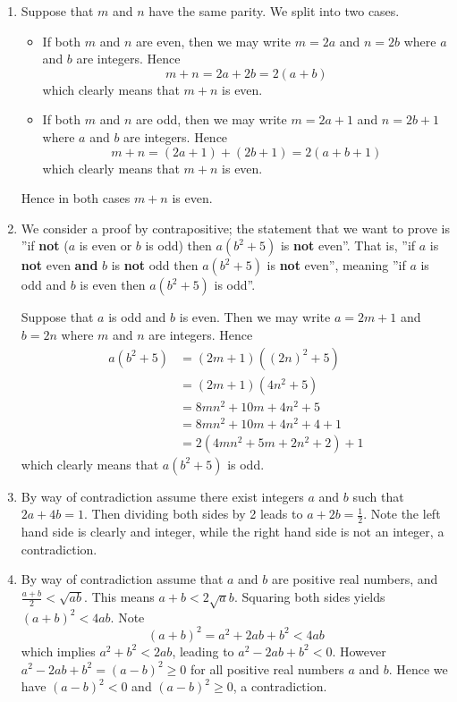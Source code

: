 \begin{enumerate}
    \item Suppose that $m$ and $n$ have the same parity. We split into two cases.
    \begin{itemize}
        \item If both $m$ and $n$ are even, then we may write $m = 2a$ and $n = 2b$ where $a$ and $b$ are integers. Hence
        \[
            m + n = 2a + 2b = 2(a+b)        
        \]
        which clearly means that $m + n$ is even.
        \item If both $m$ and $n$ are odd, then we may write $m = 2a + 1$ and $n = 2b + 1$ where $a$ and $b$ are integers. Hence
        \[
            m + n = (2a + 1) + (2b + 1) = 2(a + b + 1)        
        \]
        which clearly means that $m+n$ is even.
    \end{itemize}
    Hence in both cases $m + n$ is even.
    
    \item We consider a proof by contrapositive; the statement that we want to prove is ''if \textbf{not} ($a$ is even or $b$ is odd) then $a(b^2+5)$ is \textbf{not} even''. That is, ''if $a$ is \textbf{not} even \textbf{and} $b$ is \textbf{not} odd then $a(b^2+5)$ is \textbf{not} even'', meaning ''if $a$ is odd and $b$ is even then $a(b^2+5)$ is odd''.
    
    Suppose that $a$ is odd and $b$ is even. Then we may write $a = 2m + 1$ and $b = 2n$ where $m$ and $n$ are integers. Hence
    \begin{align*}
        a(b^2+5) &= (2m+1)\left((2n)^2 + 5\right)\\
        &= (2m+1)(4n^2 + 5)\\
        &= 8mn^2 + 10m + 4n^2 + 5\\
        &= 8mn^2 + 10m + 4n^2 + 4 + 1\\
        &= 2(4mn^2 + 5m + 2n^2 + 2) + 1
    \end{align*}
    which clearly means that $a(b^2+5)$ is odd.
    
    \item By way of contradiction assume there exist integers $a$ and $b$ such that $2a + 4b = 1$. Then dividing both sides by 2 leads to $a + 2b = \frac12$. Note the left hand side is clearly and integer, while the right hand side is not an integer, a contradiction.
    
    \item By way of contradiction assume that $a$ and $b$ are positive real numbers, and $\frac{a+b}{2} < \sqrt{ab}$. This means $a+b<2\sqrt ab$. Squaring both sides yields $(a+b)^2 < 4ab$. Note
    \[
        (a+b)^2 = a^2 + 2ab + b^2 < 4ab    
    \]
    which implies $a^2 + b^2 < 2ab$, leading to $a^2 - 2ab + b^2 < 0$. However $a^2 - 2ab + b^2 = (a-b)^2 \geq 0$ for all positive real numbers $a$ and $b$. Hence we have $(a-b)^2 < 0$ and $(a-b)^2 \geq 0$, a contradiction.
    

\end{enumerate}
